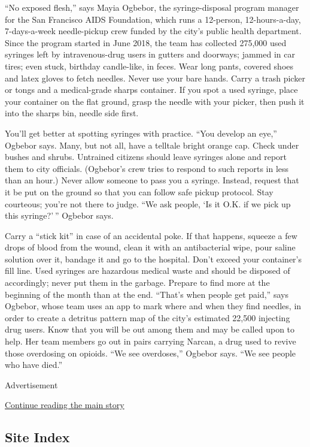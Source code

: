 ``No exposed flesh,'' says Mayia Ogbebor, the syringe-disposal program
manager for the San Francisco AIDS Foundation, which runs a 12-person,
12-hours-a-day, 7-days-a-week needle-pickup crew funded by the city's
public health department. Since the program started in June 2018, the
team has collected 275,000 used syringes left by intravenous-drug users
in gutters and doorways; jammed in car tires; even stuck, birthday
candle-like, in feces. Wear long pants, covered shoes and latex gloves
to fetch needles. Never use your bare hands. Carry a trash picker or
tongs and a medical-grade sharps container. If you spot a used syringe,
place your container on the flat ground, grasp the needle with your
picker, then push it into the sharps bin, needle side first.

You'll get better at spotting syringes with practice. ``You develop an
eye,'' Ogbebor says. Many, but not all, have a telltale bright orange
cap. Check under bushes and shrubs. Untrained citizens should leave
syringes alone and report them to city officials. (Ogbebor's crew tries
to respond to such reports in less than an hour.) Never allow someone to
pass you a syringe. Instead, request that it be put on the ground so
that you can follow safe pickup protocol. Stay courteous; you're not
there to judge. ``We ask people, `Is it O.K. if we pick up this
syringe?' '' Ogbebor says.

Carry a ``stick kit'' in case of an accidental poke. If that happens,
squeeze a few drops of blood from the wound, clean it with an
antibacterial wipe, pour saline solution over it, bandage it and go to
the hospital. Don't exceed your container's fill line. Used syringes are
hazardous medical waste and should be disposed of accordingly; never put
them in the garbage. Prepare to find more at the beginning of the month
than at the end. ``That's when people get paid,'' says Ogbebor, whose
team uses an app to mark where and when they find needles, in order to
create a detritus pattern map of the city's estimated 22,500 injecting
drug users. Know that you will be out among them and may be called upon
to help. Her team members go out in pairs carrying Narcan, a drug used
to revive those overdosing on opioids. ``We see overdoses,'' Ogbebor
says. ``We see people who have died.''

Advertisement

\protect\hyperlink{after-bottom}{Continue reading the main story}

\hypertarget{site-index}{%
\subsection{Site Index}\label{site-index}}

